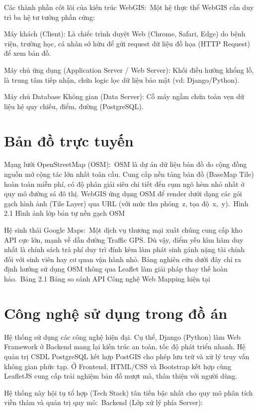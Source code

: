\documentclass[13pt,a4paper]{report}
\begin{document}
Các thành phần cốt lõi của kiến trúc WebGIS: Một hệ thực thể WebGIS cần duy trì ba hệ tư tưởng phần cứng:

Máy khách (Client): Là chiếc trình duyệt Web (Chrome, Safari, Edge) do bệnh viện, trường học, cá nhân sở hữu để gửi request dữ liệu đồ họa (HTTP Request) để xem bản đồ.

Máy chủ ứng dụng (Application Server / Web Server): Khối điều hướng khổng lồ, là trung tâm tiếp nhận, chứa logic lọc dữ liệu bảo mật (vd: Django/Python).

Máy chủ Database Không gian (Data Server): Cỗ máy ngầm chứa toàn vẹn dữ liệu hệ quy chiếu, điểm, đường (PostgreSQL).

\section{Bản đồ trực tuyến}

Mạng lưới OpenStreetMap (OSM): OSM là dự án dữ liệu bản đồ do cộng đồng nguồn mở cộng tác lớn nhất toàn cầu. Cung cấp nền tảng bản đồ (BaseMap Tile) hoàn toàn miễn phí, có độ phân giải siêu chi tiết đến cụm ngõ hẻm nhỏ nhất ở quy mô đường sá đô thị. WebGIS ứng dụng OSM để render dưới dạng các gói gạch hình ảnh (Tile Layer) qua URL (với mức thu phóng z, tọa độ x, y). Hình 2.1 Hình ảnh lớp bản tự nền gạch OSM

Hệ sinh thái Google Maps: Một dịch vụ thương mại xuất chúng cung cấp kho API cực lớn, mạnh về dẫn đường Traffic GPS. Dù vậy, điểm yếu kìm hãm duy nhất là chính sách trả phí duy trì đính kèm làm phát sinh gánh nặng tài chính đối với sinh viên hay cơ quan vận hành nhỏ. Bảng nghiên cứu dưới đây chỉ ra định hướng sử dụng OSM thông qua Leaflet làm giải pháp thay thế hoàn hảo. Bảng 2.1 Bảng so sánh API Công nghệ Web Mapping hiện tại

\section{Công nghệ sử dụng trong đồ án}

Hệ thống sử dụng các công nghệ hiện đại. Cụ thể, Django (Python) làm Web Framework ở Backend mang lại kiến trúc an toàn, tốc độ phát triển nhanh. Hệ quản trị CSDL PostgreSQL kết hợp PostGIS cho phép lưu trữ và xử lý truy vấn không gian phức tạp. Ở Frontend, HTML/CSS và Bootstrap kết hợp cùng LeafletJS cung cấp trải nghiệm bản đồ mượt mà, thân thiện với người dùng.

Hệ thống này hội tụ tổ hợp (Tech Stack) tân tiến bậc nhất cho quy mô phân tích viễn thám và quản trị quy mô: Backend (Lớp xử lý phía Server):
\end{document}
